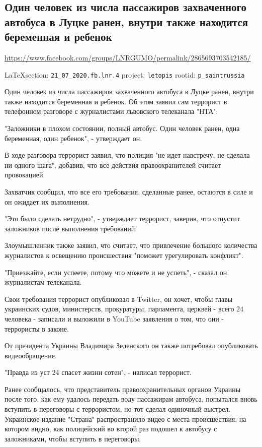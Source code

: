  
 
\subsection{Один человек из числа пассажиров захваченного автобуса в Луцке ранен, внутри также находится беременная и ребенок}
\url{https://www.facebook.com/groups/LNRGUMO/permalink/2865693703542185/}
  
\vspace{0.5cm}
{\small\LaTeX section: \verb|21_07_2020.fb.lnr.4| project: \verb|letopis| rootid: \verb|p_saintrussia|}
\vspace{0.5cm}
  
Один человек из числа пассажиров захваченного автобуса в Луцке ранен, внутри
также находится беременная и ребенок.  Об этом заявил сам террорист в
телефонном разговоре с журналистами львовского телеканала "НТА":

"Заложники в плохом состоянии, полный автобус.  Один человек ранен, одна
беременная, один ребенок", - утверждает он.

В ходе разговора террорист заявил, что полиция "не идет навстречу, не сделала
ни одного шага", добавив, что все действия правоохранителей считает
провокацией.

Захватчик сообщил, что все его требования, сделанные ранее, остаются в силе и
он ожидает их выполнения.

"Это было сделать нетрудно", - утверждает террорист, заверив, что отпустит
заложников после выполнения требований.

Злоумышленник также заявил, что считает, что привлечение большого количества
журналистов к освещению происшествия "поможет урегулировать конфликт".

"Приезжайте, если успеете, потому что можете и не успеть", - сказал он
журналистам телеканала.

Свои требования террорист опубликовал в Twitter, он хочет, чтобы главы
украинских судов, министерств, прокуратуры, парламента, церквей - всего 24
человека - записали и выложили в YouTube заявления о том, что они - террористы
в законе.

От президента Украины Владимира Зеленского он также потребовал опубликовать
видеообращение.

"Правда из уст 24 спасет жизни сотен", - написал террорист.

Ранее сообщалось, что представитель правоохранительных органов Украины после
того, как ему удалось передать воду пассажирам автобуса, попытался вновь
вступить в переговоры с террористом, но тот сделал одиночный выстрел.
Украинское издание "Страна" распространило видео с места происшествия, на
котором видно, как полицейский во второй раз подошел к автобусу с заложниками,
чтобы вступить в переговоры.

